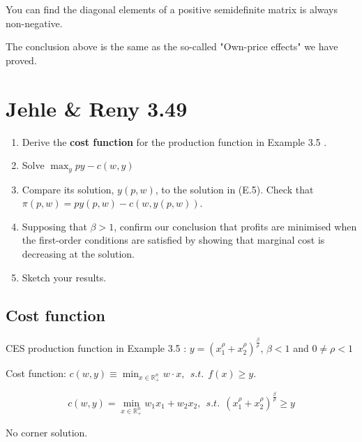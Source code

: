 \documentclass{article}
\newcommand{\R}{\mathbb{R}}
\begin{document}
You can find the diagonal elements of a positive semideﬁnite matrix is always non-negative.

The conclusion above is the same as the so-called "Own-price effects" we have proved.
\section{Jehle \& Reny 3.49}

\begin{enumerate}
\item Derive the \textbf{cost function} for the production function in Example 3.5 . 

\item Solve $\max_y py - c(w, y)$ 

\item Compare its solution, $y(p,w)$, to the solution in (E.5). Check that $\pi (p,w) = py(p,w) - c(w, y(p,w))$. 

\item Supposing that $\beta > 1$, confirm our conclusion that profits are minimised when the
first-order conditions are satisfied by showing that marginal cost is decreasing at the solution. 

\item Sketch your results.

\end{enumerate}

\subsection{Cost function}

\begin{mdframed}[backgroundcolor=blue!20,linecolor=white]
CES  production function in Example 3.5 : $y = (x_1^\rho + x_2^\rho)^{\frac{\beta}{\rho}}$, $\beta < 1$ and $0 \ne \rho <1$

Cost function: $c(w,y) \equiv \min_{x \in \R^n_+} w \cdot x , \ \ s.t. \ \ f(x) \ge y.$
\end{mdframed}


$$c(w,y) = \min_{x \in \R^n_+} w_1x_1 + w_2x_2 , \ \ s.t. \ \ (x_1^\rho + x_2^\rho)^{\frac{\beta}{\rho}} \ge y$$

No corner solution.
\end{document}
